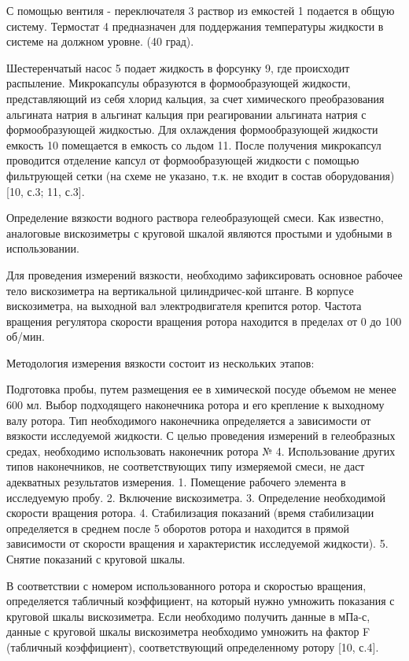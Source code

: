 \begin{multicols}{2}
С помощью вентиля - переключателя 3 раствор из емкостей 1 подается в
общую систему. Термостат 4 предназначен для поддержания температуры
жидкости в системе на должном уровне. (40 град).

Шестеренчатый насос 5 подает жидкость в форсунку 9, где происходит
распыление. Микрокапсулы образуются в формообразующей жидкости,
представляющий из себя хлорид кальция, за счет химического
преобразования альгината натрия в альгинат кальция при реагировании
альгината натрия с формообразующей жидкостью. Для охлаждения
формообразующей жидкости емкость 10 помещается в емкость со льдом 11.
После получения микрокапсул проводится отделение капсул от
формообразующей жидкости с помощью фильтрующей сетки (на схеме не
указано, т.к. не входит в состав оборудования) {[}10, с.3; 11, с.3{]}.

Определение вязкости водного раствора гелеобразующей смеси. Как
известно, аналоговые вискозиметры с круговой шкалой являются простыми и
удобными в использовании.

Для проведения измерений вязкости, необходимо зафиксировать основное
рабочее тело вискозиметра на вертикальной цилиндричес-кой штанге. В
корпусе вискозиметра, на выходной вал электродвигателя крепится ротор.
Частота вращения регулятора скорости вращения ротора находится в
пределах от 0 до 100 об/мин.

Методология измерения вязкости состоит из нескольких этапов:

Подготовка пробы, путем размещения ее в химической посуде объемом не
менее 600 мл. Выбор подходящего наконечника ротора и его крепление к
выходному валу ротора. Тип необходимого наконечника определяется а
зависимости от вязкости исследуемой жидкости. С целью проведения
измерений в гелеобразных средах, необходимо использовать наконечник
ротора № 4. Использование других типов наконечников, не соответствующих
типу измеряемой смеси, не даст адекватных результатов измерения. 1.
Помещение рабочего элемента в исследуемую пробу. 2. Включение
вискозиметра. 3. Определение необходимой скорости вращения ротора. 4.
Стабилизация показаний (время стабилизации определяется в среднем после
5 оборотов ротора и находится в прямой зависимости от скорости вращения
и характеристик исследуемой жидкости). 5. Снятие показаний с круговой
шкалы.

В соответствии с номером использованного ротора и скоростью вращения,
определяется табличный коэффициент, на который нужно умножить показания
с круговой шкалы вискозиметра. Если необходимо получить данные в мПа-с,
данные с круговой шкалы вискозиметра необходимо умножить на фактор F
(табличный коэффициент), соответствующий определенному ротору {[}10,
с.4{]}.


\end{multicols}
